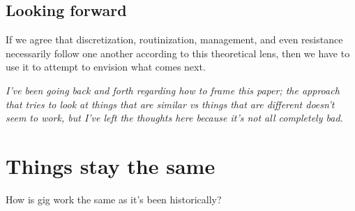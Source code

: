 \documentclass{sigchi}
\begin{document}









\subsection{Looking forward}
If we agree that
discretization,
routinization,
management,
and even resistance
necessarily follow one another according to this theoretical lens,
then we have to use it to attempt to envision
what comes next.



\textit{I've been going back and forth regarding how to frame this paper;
the approach that tries to look at
things that are similar vs things that are different
doesn't seem to work, but
I've left the thoughts here because it's not all completely bad.}

\section{Things stay the same}
How is gig work the same as it's been historically?
\end{document}
